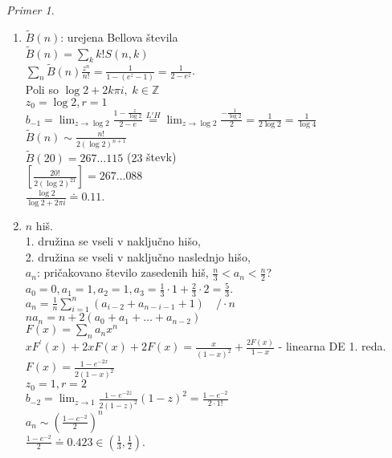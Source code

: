 \documentclass[a4paper, 12pt]{book}
\theoremstyle{definition}
\theoremstyle{remark}
\newtheorem*{ex}{Primer}
\newcommand{\Z}{\mathbb{Z}}
\begin{document}
\begin{ex}
\begin{enumerate}[label=(\arabic*)]
    \item $\widetilde{B}(n)$: urejena Bellova števila \\
      $\widetilde{B}(n) = \sum_k k! S(n,k)$ \\
      $\sum_n \widetilde{B}(n) \frac{z^n}{n!} = \frac{1}{1 - (e^z-1)} = \frac{1}{2-e^z}$. \\
      Poli so $\log 2 + 2 k \pi i, \; k \in \Z$ \\
      $z_0 = \log 2, r = 1$ \\
      $b_{-1} = \lim_{z \to \log 2} \frac{1 - \frac{z}{\log 2}}{2 - e} \stackrel{L'H}{=}
      \lim_{z \to \log 2} \frac{-\frac{1}{\log 2}}{2} = \frac{1}{2 \log 2} = \frac{1}{\log 4}$ \\
      $\widetilde{B}(n) \sim \frac{n!}{2 (\log 2)^{n+1}}$ \\
      $\widetilde{B}(20) = 267 \dots 115$ ($23$ števk) \\
      $\left[\frac{20!}{2 (\log 2)^{21}}\right] = 267 \dots 088$ \\
      $\frac{\log 2}{\log 2 + 2 \pi i} \doteq 0.11$.
    \item $n$ hiš. \\
      1. družina se vseli v naključno hišo, \\
      2. družina se vseli v naključno naslednjo hišo, \\
      $a_n$: pričakovano število zasedenih hiš, $\frac{n}{3} < a_n < \frac{n}{2}$? \\
      $a_0 = 0, a_1 = 1, a_2 = 1, a_3 = \frac{1}{3} \cdot 1 + \frac{2}{3} \cdot 2 = \frac{5}{3}$. \\
      $a_n = \frac{1}{n} \sum_{i=1}^{n} (a_{i-2} + a_{n-i-1} + 1) \quad / \cdot n$ \\
      $n a_n = n + 2(a_0 + a_1 + \dots + a_{n-2})$ \\
      $F(x) = \sum_n a_n x^n$ \\
      $x F^{'}(x) + 2 x F(x) + 2 F(x) = \frac{x}{(1-x)^2} + \frac{2 F(x)}{1-x}$ - linearna DE 1. reda. \\
      $F(x) = \frac{1 - e^{-2x}}{2 (1-x)^2}$ \\
      $z_0 = 1, r = 2$ \\
      $b_{-2} = \lim_{z \to 1} \frac{1 - e^{-2z}}{2 (1-z)^2} (1-z)^2 = \frac{1 - e^{-2}}{2 \cdot 1!}$ \\
      $a_n \sim \left(\frac{1-e^{-2}}{2}\right)^n$ \\
      $\frac{1-e^{-2}}{2} \doteq 0.423 \in \left(\frac{1}{3}, \frac{1}{2}\right)$.
  \end{enumerate}
\end{ex}
\end{document}
